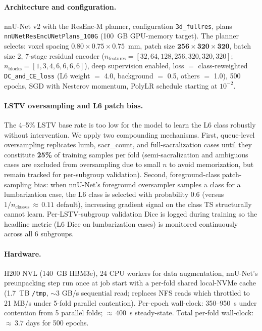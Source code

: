 \documentclass{article}
\begin{document}
\paragraph{Architecture and configuration.}
nnU-Net v2 with the ResEnc-M planner, configuration
\texttt{3d\_fullres}, plans
\texttt{nnUNetResEncUNetPlans\_100G} (100~GB GPU-memory target).
The planner selects:
voxel spacing $0.80\!\times\!0.75\!\times\!0.75$~mm,
patch size $\boldsymbol{256\!\times\!320\!\times\!320}$,
batch size 2, 7-stage residual encoder
($n_\text{features}=[32,64,128,256,320,320,320]$;
$n_\text{blocks}=[1,3,4,6,6,6,6]$),
deep supervision enabled,
loss $=$ class-reweighted \texttt{DC\_and\_CE\_loss} (L6 weight
$=$ 4.0, background $=$ 0.5, others $=$ 1.0),
500 epochs, SGD with Nesterov momentum,
PolyLR schedule starting at $10^{-2}$.

\paragraph{LSTV oversampling and L6 patch bias.}
The 4--5\% LSTV base rate is too low for the model to learn the
L6 class robustly without intervention.
We apply two compounding mechanisms.
First, queue-level oversampling replicates lumb, sacr\_count,
and full-sacralization cases until they constitute \textbf{25\%}
of training samples per fold (semi-sacralization and ambiguous
cases are excluded from oversampling due to small $n$ to avoid
memorization, but remain tracked for per-subgroup validation).
Second, foreground-class patch-sampling bias: when nnU-Net's
foreground oversampler samples a class for a lumbarization case,
the L6 class is selected with probability 0.6 (versus
$1/n_\text{classes}\,{\approx}\,0.11$ default), increasing
gradient signal on the class TS structurally cannot learn.
Per-LSTV-subgroup validation Dice is logged during training so
the headline metric (L6 Dice on lumbarization cases) is monitored
continuously across all 6 subgroups.

\paragraph{Hardware.}
H200 NVL (140~GB HBM3e), 24 CPU workers for data augmentation,
nnU-Net's preunpacking step run once at job start with a per-fold
shared local-NVMe cache (1.7~TB \texttt{/tmp}, $\sim$3 GB/s
sequential read; replaces NFS reads which throttled to 21 MB/s
under 5-fold parallel contention).
Per-epoch wall-clock: 350--950~s under contention from 5 parallel
folds; ${\approx}\,400$~s steady-state. Total per-fold wall-clock:
${\approx}\,3.7$ days for 500 epochs.
\end{document}
